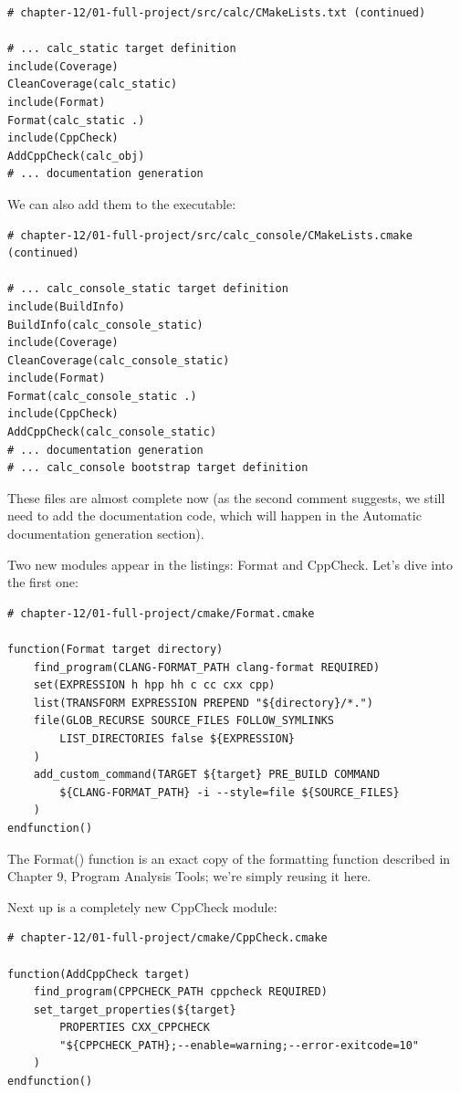 \begin{lstlisting}[style=styleCMake]
# chapter-12/01-full-project/src/calc/CMakeLists.txt (continued)

# ... calc_static target definition
include(Coverage)
CleanCoverage(calc_static)
include(Format)
Format(calc_static .)
include(CppCheck)
AddCppCheck(calc_obj)
# ... documentation generation
\end{lstlisting}

We can also add them to the executable:

\begin{lstlisting}[style=styleCMake]
# chapter-12/01-full-project/src/calc_console/CMakeLists.cmake (continued)

# ... calc_console_static target definition
include(BuildInfo)
BuildInfo(calc_console_static)
include(Coverage)
CleanCoverage(calc_console_static)
include(Format)
Format(calc_console_static .)
include(CppCheck)
AddCppCheck(calc_console_static)
# ... documentation generation
# ... calc_console bootstrap target definition
\end{lstlisting}

These files are almost complete now (as the second comment suggests, we still need to add the documentation code, which will happen in the Automatic documentation generation section).

Two new modules appear in the listings: Format and CppCheck. Let's dive into the first one:

\begin{lstlisting}[style=styleCMake]
# chapter-12/01-full-project/cmake/Format.cmake

function(Format target directory)
	find_program(CLANG-FORMAT_PATH clang-format REQUIRED)
	set(EXPRESSION h hpp hh c cc cxx cpp)
	list(TRANSFORM EXPRESSION PREPEND "${directory}/*.")
	file(GLOB_RECURSE SOURCE_FILES FOLLOW_SYMLINKS
		LIST_DIRECTORIES false ${EXPRESSION}
	)
	add_custom_command(TARGET ${target} PRE_BUILD COMMAND
		${CLANG-FORMAT_PATH} -i --style=file ${SOURCE_FILES}
	)
endfunction()
\end{lstlisting}

The Format() function is an exact copy of the formatting function described in Chapter 9, Program Analysis Tools; we're simply reusing it here.

Next up is a completely new CppCheck module:

\begin{lstlisting}[style=styleCMake]
# chapter-12/01-full-project/cmake/CppCheck.cmake

function(AddCppCheck target)
	find_program(CPPCHECK_PATH cppcheck REQUIRED)
	set_target_properties(${target}
		PROPERTIES CXX_CPPCHECK
		"${CPPCHECK_PATH};--enable=warning;--error-exitcode=10"
	)
endfunction()
\end{lstlisting}

